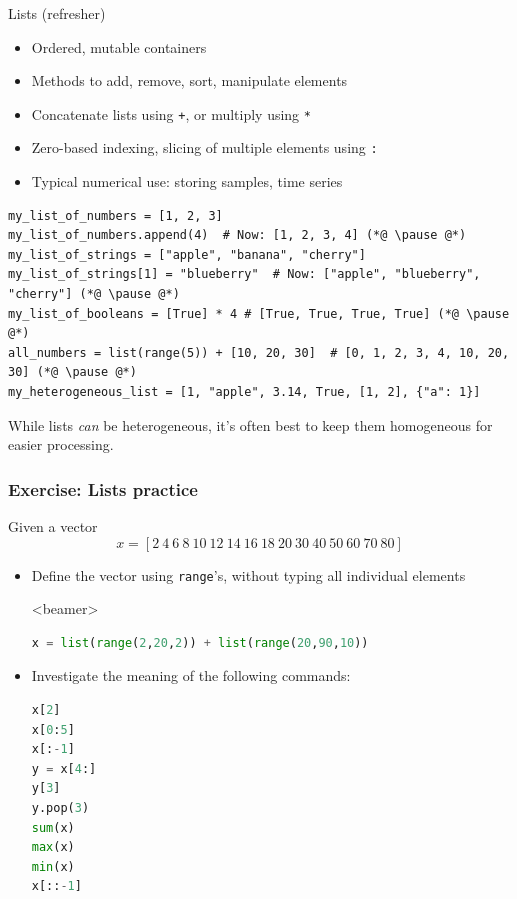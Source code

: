 \begin{frame}[fragile]{Lists (refresher)}
\begin{itemize}
  \item Ordered, mutable containers
  \item Methods to add, remove, sort, manipulate elements
  \item Concatenate lists using \lstinline|+|, or multiply using \lstinline|*|
  \item Zero-based indexing, slicing of multiple elements using \lstinline|:|
  \item Typical numerical use: storing samples, time series
\end{itemize}
\begin{lstlisting}
my_list_of_numbers = [1, 2, 3]
my_list_of_numbers.append(4)  # Now: [1, 2, 3, 4] (*@ \pause @*)
my_list_of_strings = ["apple", "banana", "cherry"]
my_list_of_strings[1] = "blueberry"  # Now: ["apple", "blueberry", "cherry"] (*@ \pause @*)
my_list_of_booleans = [True] * 4 # [True, True, True, True] (*@ \pause @*)
all_numbers = list(range(5)) + [10, 20, 30]  # [0, 1, 2, 3, 4, 10, 20, 30] (*@ \pause @*)
my_heterogeneous_list = [1, "apple", 3.14, True, [1, 2], {"a": 1}]
\end{lstlisting}
\pause
While lists \emph{can} be heterogeneous, it's often best to keep them homogeneous for easier processing.
\end{frame}

\begin{frame}[fragile]
  \frametitle{Exercise: Lists practice}
  Given a vector 
  \[ 
     x = \left[2 \ 4 \ 6 \ 8 \ 10 \ 12 \ 14 \ 16 \ 18 \ 20 \ 30 \ 40 \ 50 \ 60 \ 70 \ 80 \right]
  \]
  \begin{itemize}
   \item Define the vector using \lstinline|range|'s, without typing all individual elements
   \pause
   \begin{onlyenv}<beamer> 
    \begin{lstlisting}[language=Python]
x = list(range(2,20,2)) + list(range(20,90,10))
     \end{lstlisting}
     \pause
    \end{onlyenv}
   \item Investigate the meaning of the following commands:
   \begin{lstlisting}[language=Python]
x[2]            
x[0:5]          
x[:-1]          
y = x[4:]       
y[3]            
y.pop(3)      
sum(x)    
max(x)       
min(x) 
x[::-1]       
     \end{lstlisting}    
  \end{itemize}
 \end{frame}

